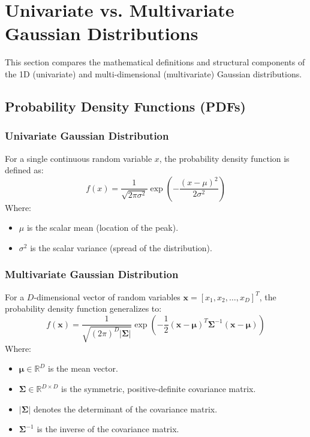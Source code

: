 \section{Univariate vs. Multivariate Gaussian Distributions}

This section compares the mathematical definitions and structural components of the 1D (univariate) and multi-dimensional (multivariate) Gaussian distributions.

\subsection{Probability Density Functions (PDFs)}

\subsubsection{Univariate Gaussian Distribution}
For a single continuous random variable $x$, the probability density function is defined as:
\begin{equation}
f(x) = \frac{1}{\sqrt{2\pi\sigma^2}} \exp\left( -\frac{(x - \mu)^2}{2\sigma^2} \right)
\end{equation}
Where:
\begin{itemize}
    \item $\mu$ is the scalar mean (location of the peak).
    \item $\sigma^2$ is the scalar variance (spread of the distribution).
\end{itemize}

\subsubsection{Multivariate Gaussian Distribution}
For a $D$-dimensional vector of random variables $\mathbf{x} = [x_1, x_2, \dots, x_D]^T$, the probability density function generalizes to:
\begin{equation}
f(\mathbf{x}) = \frac{1}{\sqrt{(2\pi)^D |\boldsymbol{\Sigma}|}} \exp\left( -\frac{1}{2} (\mathbf{x} - \boldsymbol{\mu})^T \boldsymbol{\Sigma}^{-1} (\mathbf{x} - \boldsymbol{\mu}) \right)
\end{equation}
Where:
\begin{itemize}
    \item $\boldsymbol{\mu} \in \mathbb{R}^D$ is the mean vector.
    \item $\boldsymbol{\Sigma} \in \mathbb{R}^{D \times D}$ is the symmetric, positive-definite covariance matrix.
    \item $|\boldsymbol{\Sigma}|$ denotes the determinant of the covariance matrix.
    \item $\boldsymbol{\Sigma}^{-1}$ is the inverse of the covariance matrix.
\end{itemize}

